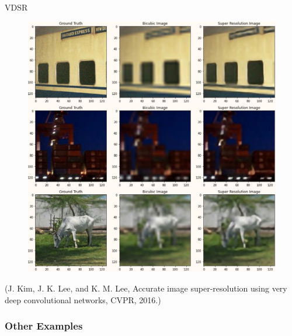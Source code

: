 \begin{frame}[allowframebreaks]
\begin{mydefinitionblock}{8.7}{VDSR}
    \begin{figure}[H]
        \centering
        \includegraphics[width=1.0\textwidth]{.././assets/8.6.png}
    \end{figure}

    (J. Kim, J. K. Lee, and K. M. Lee, Accurate image super-resolution using very deep convolutional networks, CVPR, 2016.)
\end{mydefinitionblock}

\end{frame}

\subsubsection{Other Examples}

